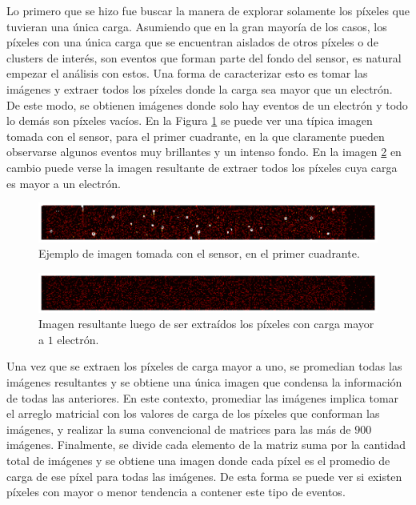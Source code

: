 Lo primero que se hizo fue buscar la manera de explorar solamente los píxeles que tuvieran una única carga. Asumiendo que en la gran mayoría de los casos, los píxeles con una única carga que se encuentran aislados de otros píxeles o de clusters de interés, son eventos que forman parte del fondo del sensor, es natural empezar el análisis con estos. Una forma de caracterizar esto es tomar las imágenes y extraer todos los píxeles donde la carga sea mayor que un electrón. De este modo, se obtienen imágenes donde solo hay eventos de un electrón y todo lo demás son píxeles vacíos. En la Figura \ref{fig:ImagenFitsOriginal} se puede ver una típica imagen tomada con el sensor, para el primer cuadrante, en la que claramente pueden observarse algunos eventos muy brillantes y un intenso fondo. En la imagen \ref{fig:ImagenFits1e} en cambio puede verse la imagen resultante de extraer todos los píxeles cuya carga es mayor a un electrón.
\begin{figure}[h]
    \centering
    \includegraphics[scale=0.4]{Figs/imagen_fits_original.pdf}
    \caption{Ejemplo de imagen tomada con el sensor, en el primer cuadrante.}
    \label{fig:ImagenFitsOriginal}
\end{figure}

\begin{figure}[h]
    \centering
    \includegraphics[scale=0.4]{Figs/imagen_fits_1_e.pdf}
    \caption{Imagen resultante luego de ser extraídos los píxeles con carga mayor a $1$ electrón.}
    \label{fig:ImagenFits1e}
\end{figure}
Una vez que se extraen los píxeles de carga mayor a uno, se promedian todas las imágenes resultantes y se obtiene una única imagen que condensa la información de todas las anteriores. En este contexto, promediar las imágenes implica tomar el arreglo matricial con los valores de carga de los píxeles que conforman las imágenes, y realizar la suma convencional de matrices para las más de $900$ imágenes. Finalmente, se divide cada elemento de la matriz suma por la cantidad total de imágenes y se obtiene una imagen donde cada píxel es el promedio de carga de ese píxel para todas las imágenes. De esta forma se puede ver si existen píxeles con mayor o menor tendencia a contener este tipo de eventos.


